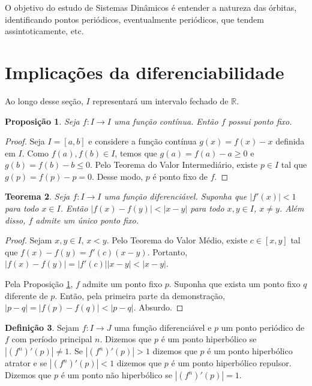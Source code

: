 \documentclass[a4paper, 12pt]{article}
\theoremstyle{definition}
\newtheorem{definition}{Definição}[section]
\theoremstyle{plain}
\newtheorem{proposition}[definition]{Proposição}
\theoremstyle{plain}
\theoremstyle{plain}
\newtheorem{theorem}[definition]{Teorema}
\theoremstyle{remark}
\newcommand{\RR}{\mathbb{R}}
\begin{document}
O objetivo do estudo de Sistemas Dinâmicos é entender a natureza das órbitas, identificando pontos periódicos, eventualmente periódicos, que tendem assintoticamente, etc.

\section{Implicações da diferenciabilidade}

Ao longo desse seção, $I$ representará um intervalo fechado de $\RR$.  

\begin{proposition}
\label{prop ponto fixo}
Seja $f: I \rightarrow I$ uma função contínua. Então $f$ possui ponto fixo.
\end{proposition}

\begin{proof}
Seja $I = [a, b]$ e considere a função contínua $g(x) = f(x) - x$ definida em $I$. Como $f(a), f(b) \in I$, temos que $g(a) = f(a) - a \geq 0$ e $g(b) = f(b) - b \leq 0$. Pelo Teorema do Valor Intermediário, existe $p \in I$ tal que $g(p) = f(p) -p = 0$. Desse modo, $p$ é ponto fixo de $f$.
\end{proof}

\begin{theorem}
\label{teo ponto fixo unico}
Seja $f:I \rightarrow I$ uma função diferenciável. Suponha que $|f'(x)|<1$ para todo $x \in I$. Então $|f(x) - f(y)| < |x - y|$ para todo $x, y \in I$, $x \neq y$. Além disso,  $f$ admite um único ponto fixo.
\end{theorem}

\begin{proof}
Sejam $x, y \in I$, $x < y$. Pelo Teorema do Valor Médio, existe $c \in [x, y]$ tal que $f(x) - f(y) = f'(c)(x - y)$. Portanto, $|f(x) - f(y)| = |f'(c)||x - y| < |x - y|$.

Pela Proposição \ref{prop ponto fixo}, $f$ admite um ponto fixo $p$. Suponha que exista um ponto fixo $q$ diferente de $p$. Então, pela primeira parte da demonstração, $|p - q| = |f(p) - f(q)| < |p - q|$. Absurdo.
\end{proof}

\begin{definition}
Sejam $f: I \rightarrow J$ uma função diferenciável e $p$ um ponto periódico de $f$ com período principal $n$. Dizemos que $p$ é um ponto hiperbólico se $|(f^n)'(p)| \neq 1$. Se $|(f^n)'(p)| > 1$ dizemos que $p$ é um ponto hiperbólico atrator e se $|(f^n)'(p)| < 1$ dizemos que $p$ é um ponto hiperbólico repulsor. Dizemos que $p$ é um ponto não hiperbólico se $|(f^n)'(p)| = 1$.
\end{definition}
\end{document}
